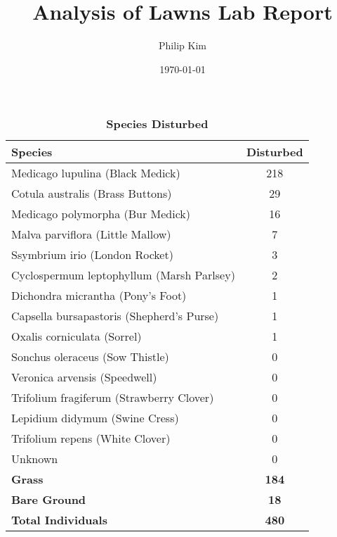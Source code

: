 \documentclass{article}
\title{Analysis of Lawns Lab Report}
\author{Philip Kim}
\date{\today}
\begin{document}
\maketitle
\begin{table}[h!]
  \begin{center}
    \caption{\textbf{Species Disturbed}}
    \begin{tabular}{|l|c|}\hline
      \textbf{Species} & \textbf{Disturbed}\\ \hline
      Medicago lupulina (Black Medick) & 218 \\\hline
      Cotula australis (Brass Buttons) & 29 \\\hline
      Medicago polymorpha (Bur Medick) & 16 \\\hline
      Malva parviflora (Little Mallow) & 7 \\\hline
      Ssymbrium irio (London Rocket) & 3 \\\hline
      Cyclospermum leptophyllum (Marsh Parlsey) & 2 \\\hline
      Dichondra micrantha (Pony's Foot) & 1 \\\hline
      Capsella bursapastoris (Shepherd's Purse) & 1 \\\hline
      Oxalis corniculata (Sorrel) & 1 \\\hline
      Sonchus oleraceus (Sow Thistle) & 0 \\\hline
      Veronica arvensis (Speedwell) & 0 \\\hline
      Trifolium fragiferum (Strawberry Clover) & 0 \\\hline
      Lepidium didymum (Swine Cress) & 0 \\\hline
      Trifolium repens (White Clover) & 0 \\\hline
      Unknown & 0 \\\hline
      \textbf{Grass} & \textbf{184} \\\hline
      \textbf{Bare Ground} & \textbf{18} \\\hline
      \textbf{Total Individuals} & \textbf{480} \\\hline
    \end{tabular}
  \end{center}
\end{table}
\newpage
\end{document}
